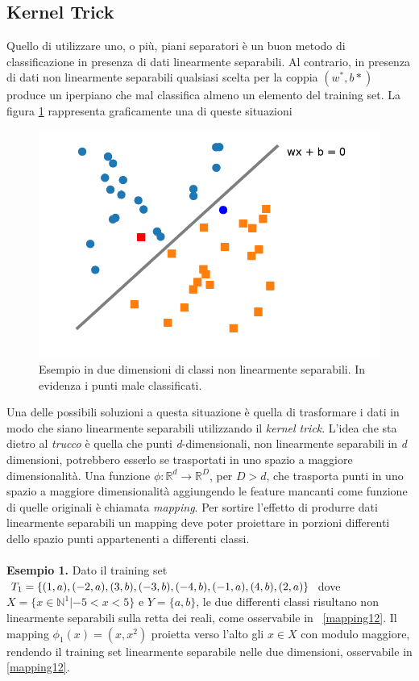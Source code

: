 \documentclass [11pt,a4paper,twoside,openright] {book}
\begin{document}
\subsection{Kernel Trick}
Quello di utilizzare uno, o più, piani separatori è un buon metodo di classificazione in presenza di dati linearmente separabili. Al contrario, in presenza di dati non linearmente separabili qualsiasi scelta per la coppia $(w^*, b*)$ produce un iperpiano che mal classifica almeno un elemento del training set. La figura \ref{nonseparabili} rappresenta graficamente una di queste situazioni
\begin{figure}[!h]
\centering
\includegraphics[scale=.6]{figure/nonseparabili.pdf}
\caption{Esempio in due dimensioni di classi non linearmente separabili. In evidenza i punti male classificati. \label{nonseparabili}}
\end{figure}
Una delle possibili soluzioni a questa situazione è quella di trasformare i dati in modo che siano linearmente separabili utilizzando il \textit{kernel trick}. L'idea che sta dietro al \textit{trucco} è quella che punti \textit{d}-dimensionali, non linearmente separabili in \textit{d} dimensioni, potrebbero esserlo se trasportati in uno spazio a maggiore dimensionalità. Una funzione $\phi: \mathbb{R}^d \rightarrow \mathbb{R}^D$, per $D > d$, che trasporta punti in uno spazio a maggiore dimensionalità aggiungendo le feature mancanti come funzione di quelle originali è chiamata \textit{mapping}. Per sortire l'effetto di produrre dati linearmente separabili un mapping deve poter proiettare in porzioni differenti dello spazio punti appartenenti a differenti classi.\\\\
\textbf{Esempio 1.} Dato il training set $T_1=\lbrace (1,a),(-2,a),(3,b),(-3,b),(-4,b), \linebreak (-1,a),(4,b),(2,a) \rbrace$ dove $X = \lbrace x \in \mathbb{N}^1 | -5 < x < 5 \rbrace$ e $Y=\lbrace a,b \rbrace$, le due differenti classi risultano non linearmente separabili sulla retta dei reali, come osservabile in \figurename~\ref{mapping12}. Il mapping $\phi_1(x)=(x,x^2)$ proietta verso l'alto gli $x \in X$ con modulo maggiore, rendendo il training set linearmente separabile nelle due dimensioni, osservabile in \ref{mapping12}.
\end{document}
